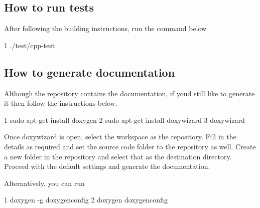 \subsection*{How to run tests}

After following the building instructions, run the command below 
\begin{DoxyCode}
1 ./test/cpp-test
\end{DoxyCode}


\subsection*{How to generate documentation}

Although the repository contains the documentation, if you\textquotesingle{}d still like to generate it then follow the instructions below.


\begin{DoxyCode}
1 sudo apt-get install doxygen
2 sudo apt-get install doxywizard
3 doxywizard
\end{DoxyCode}


Once doxywizard is open, select the workspace as the repository. Fill in the details as required and set the source code folder to the repository as well. Create a new folder in the repository and select that as the destination directory. Proceed with the default settings and generate the documentation.

Alternatively, you can run


\begin{DoxyCode}
1 doxygen -g doxygenconfig
2 doxygen doxygenconfig
\end{DoxyCode}
 